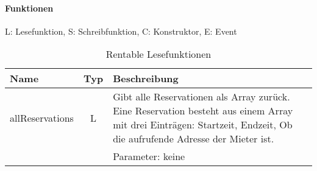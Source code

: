 \paragraph{Funktionen}

L: Lesefunktion, S: Schreibfunktion, C: Konstruktor, E: Event

\begin{longtable}{@{}lcL{9cm}@{}}
\caption{Rentable Lesefunktionen}\label{tbl:Rentable_Funktionsuebersicht}\\
\toprule
Name & Typ & Beschreibung \\
\midrule
allReservations     & L   & Gibt alle Reservationen als Array zurück. Eine Reservation besteht aus einem Array mit drei Einträgen: Startzeit, Endzeit, Ob die aufrufende Adresse der Mieter ist.\\
 & & Parameter: keine
 

\end{longtable}
